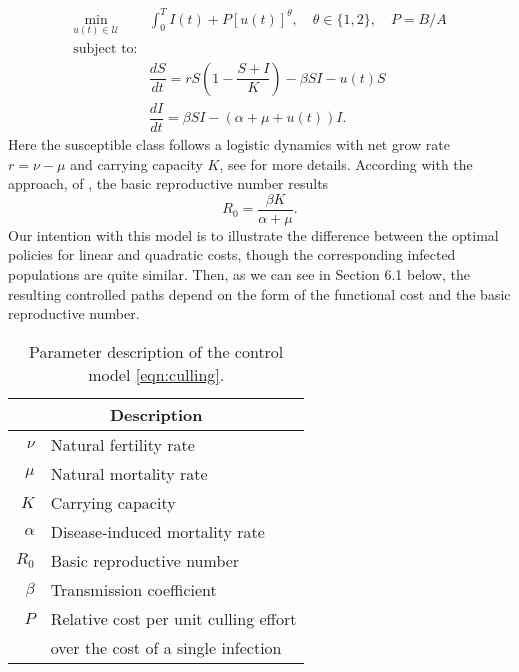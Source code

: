 \begin{equation}\label{eqn:culling}
	\begin{aligned}
  \min_{u(t)\in \mathcal{U}}
    &
    \int_0^T
      I(t) + P [u(t)]^{\theta}, \quad \theta \in \{1,2\},
      \quad P = B/A
  \\ \textrm{subject to:} &
  \\
    &\dfrac{dS}{dt} =
			r S 
			\left (
				1 - \dfrac{S+I}{K}
			\right)
			 - \beta SI - u(t) S
		\\
		&\dfrac{dI}{dt} =
			\beta SI - (\alpha + \mu + u(t)) I.
	\end{aligned}
\end{equation}
%
Here the susceptible class follows a logistic dynamics with net grow rate
$r = \nu - \mu$ and carrying capacity $K$, see 
for more details. According with the approach, 
of \citet{VandenDriessche2017}, the basic reproductive number results
$$
  R_0 = \frac{\beta K}{\alpha + \mu}.
$$ 
  Our intention with this model is to illustrate the difference between the optimal policies for linear and quadratic costs, though the corresponding infected populations are quite similar. Then, as we can see in Section 6.1 below, the resulting controlled paths depend on the form of the functional cost and the basic reproductive 
number.%
\begin{table}
  \begin{center}
    \begin{tabular}{@{}rl@{}}
        \toprule
      \multicolumn{2}{c}{\bf{Description}}
      \\
      \midrule
      $\nu$
        &
          Natural fertility rate
      \\
      $\mu$
        & Natural mortality rate
      \\
      $K$
        & Carrying capacity
      \\
      $\alpha$
        & Disease-induced mortality rate
      \\
      $R_0$
        & Basic reproductive number
      \\
      $\beta$
        & Transmission coefficient
      \\
      $P$
        & Relative cost per unit culling effort \\
        & over the cost of a single infection
      \\
      \bottomrule
    \end{tabular}
  \end{center}
  \caption{Parameter description of the control model \eqref{eqn:culling}.}
  \label{tbl:culling_parameter_des}
\end{table}